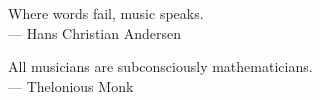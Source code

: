 \thispagestyle{empty}
{}

\vspace*{3cm}


\medskip

\begin{center}
    Where words fail, music speaks. \\ \smallskip
    --- Hans Christian Andersen
\end{center}

\begin{center}
    All musicians are subconsciously mathematicians. \\ \smallskip
    --- Thelonious Monk
\end{center}
